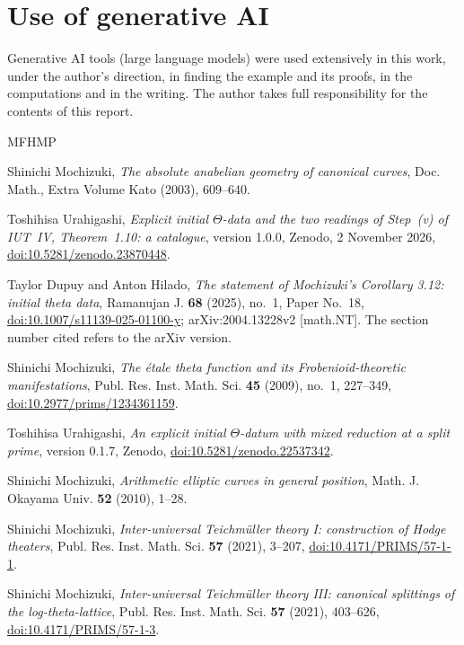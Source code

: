 \documentclass[11pt,a4paper]{article}
\theoremstyle{plain}
\theoremstyle{definition}
\begin{document}
\section*{Use of generative AI}
Generative AI tools (large language models) were used extensively in this work, under the author's direction, in
finding the example and its proofs, in the computations and in the writing. The author takes full responsibility for
the contents of this report.

\begin{thebibliography}{MFHMP}\raggedright
{}
Shinichi Mochizuki, \emph{The absolute anabelian geometry of canonical curves}, Doc. Math., Extra Volume Kato (2003),
609--640.

Toshihisa Urahigashi, \emph{Explicit initial $\Theta$-data and the two readings of Step~(v) of {IUT}~{IV},
{T}heorem~1.10: a catalogue}, version 1.0.0, Zenodo, 2 November 2026,
\href{https://doi.org/10.5281/zenodo.23870448}{doi:10.5281/zenodo.23870448}.

Taylor Dupuy and Anton Hilado, \emph{The statement of {M}ochizuki's {C}orollary 3.12: initial theta data}, Ramanujan J.
\textbf{68} (2025), no.~1, Paper No.~18, \href{https://doi.org/10.1007/s11139-025-01100-y}{doi:10.1007/s11139-025-01100-y};
arXiv:2004.13228v2 [math.NT]. The section number cited refers to the arXiv version.

Shinichi Mochizuki, \emph{The \'etale theta function and its {F}robenioid-theoretic manifestations}, Publ. Res. Inst.
Math. Sci. \textbf{45} (2009), no.~1, 227--349, \href{https://doi.org/10.2977/prims/1234361159}{doi:10.2977/prims/1234361159}.

Toshihisa Urahigashi, \emph{An explicit initial $\Theta$-datum with mixed reduction at a split prime}, version 0.1.7,
Zenodo, \href{https://doi.org/10.5281/zenodo.22537342}{doi:10.5281/zenodo.22537342}.

Shinichi Mochizuki, \emph{Arithmetic elliptic curves in general position}, Math. J. Okayama Univ. \textbf{52} (2010),
1--28.

Shinichi Mochizuki, \emph{Inter-universal {T}eichm\"uller theory {I}: construction of {H}odge theaters}, Publ. Res.
Inst. Math. Sci. \textbf{57} (2021), 3--207, \href{https://doi.org/10.4171/PRIMS/57-1-1}{doi:10.4171/PRIMS/57-1-1}.

Shinichi Mochizuki, \emph{Inter-universal {T}eichm\"uller theory {III}: canonical splittings of the log-theta-lattice},
Publ. Res. Inst. Math. Sci. \textbf{57} (2021), 403--626, \href{https://doi.org/10.4171/PRIMS/57-1-3}{doi:10.4171/PRIMS/57-1-3}.


\end{thebibliography}
\end{document}
